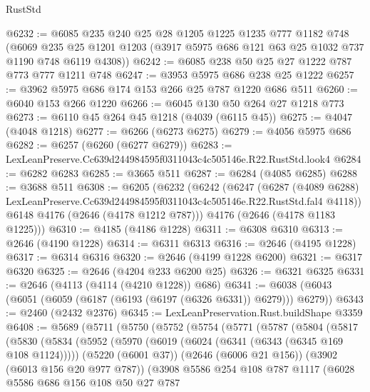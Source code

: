 \begin{lexlean}{RustStd}
\begin{coremodule}
@6232 := @6085
    @235
    @240
    @25
    @28
    @1205
    @1225
    @1235
    @777
    @1182
    @748
    (@6069 @235 @25 @1201 @1203 (@3917 @5975 @686 @121 @63 @25 @1032 @737 @1190 @748 @6119 @4308))
@6242 := @6085 @238 @50 @25 @27 @1222 @787 @773 @777 @1211 @748
@6247 := @3953 @5975 @686 @238 @25 @1222
@6257 := @3962 @5975 @686 @174 @153 @266 @25 @787 @1220 @686 @511
@6260 := @6040 @153 @266 @1220
@6266 := @6045 @130 @50 @264 @27 @1218 @773
@6273 := @6110 @45 @264 @45 @1218 (@4039 (@6115 @45))
@6275 := @4047 (@4048 @1218)
@6277 := @6266 (@6273 @6275)
@6279 := @4056 @5975 @686
@6282 := @6257 (@6260 (@6277 @6279))
@6283 := LexLeanPreserve.Cc639d244984595f0311043c4c505146e.R22.RustStd.look4
@6284 := @6282 @6283
@6285 := @3665 @511
@6287 := @6284 (@4085 @6285)
@6288 := @3688 @511
@6308 := @6205
    (@6232
      (@6242
        (@6247
          (@6287
            (@4089 @6288)
            LexLeanPreserve.Cc639d244984595f0311043c4c505146e.R22.RustStd.fal4
            @4118))
        @6148
        @4176
        (@2646 (@4178 @1212 @787)))
      @4176
      (@2646 (@4178 @1183 @1225)))
@6310 := @4185 (@4186 @1228)
@6311 := @6308 @6310
@6313 := @2646 (@4190 @1228)
@6314 := @6311 @6313
@6316 := @2646 (@4195 @1228)
@6317 := @6314 @6316
@6320 := @2646 (@4199 @1228 @6200)
@6321 := @6317 @6320
@6325 := @2646 (@4204 @233 @6200 @25)
@6326 := @6321 @6325
@6331 := @2646 (@4113 (@4114 (@4210 @1228)) @686)
@6341 := @6038 (@6043 (@6051 (@6059 (@6187 (@6193 (@6197 (@6326 @6331)) @6279))) @6279))
@6343 := @2460 (@2432 @2376)
@6345 := LexLeanPreservation.Rust.buildShape @3359
@6408 := @5689
    (@5711
      (@5750
        (@5752
          (@5754
            (@5771
              (@5787
                (@5804
                  (@5817
                    (@5830
                      (@5834
                        (@5952
                          (@5970
                            (@6019 (@6024 (@6341 (@6343 (@6345 @169 @108 @1124)))))
                            (@5220 (@6001 @37))
                            (@2646 (@6006 @21 @156))
                            (@3902 (@6013 @156 @20 @977 @787))
                            (@3908
                              @5586
                              @254
                              @108
                              @787
                              @1117
                              (@6028
                                @5586
                                @686
                                @156
                                @108
                                @50
                                @27
                                @787

\end{coremodule}
\end{lexlean}
